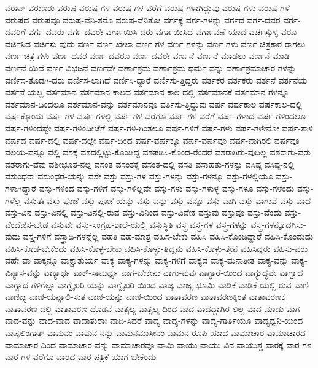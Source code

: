 {ವರಾನ್
ವರುಣರು
ವರುಷ
ವರುಷ-ಗಳ
ವರುಷ-ಗಳ-ವರೆಗೆ
ವರುಷ-ಗಳಾಗಿದ್ದುವು
ವರುಷ-ಗಳು
ವರುಷ-ಗಳೆ
ವರುಷದ
ವರುಷವೂ
ವರುಷ-ವೆನಿ-ತನೊ
ವರುಷ-ವೆನಿತೋ
ವರ್ಗಕ್ಕೆ
ವರ್ಗ-ಗಳನ್ನು
ವರ್ಗದ
ವರ್ಗ-ದವರ
ವರ್ಗ-ದವರಿಗೆ
ವರ್ಗ-ದವರು
ವರ್ಗ-ದವರೇ
ವರ್ಗಾಯಿಸಿ-ದರು
ವರ್ಗಾಯಿಸಿದೆ
ವರ್ಗಾವಣೆ-ಯಾದ
ವರ್ಚಸ್ಸುಳ್ಳ-ವರೂ
ವರ್ಜಿಸಿದ
ವರ್ಜಿಸು-ವುದು
ವರ್ಣ
ವರ್ಣ-ಖೇಲಾ
ವರ್ಣ-ಗಳ
ವರ್ಣ-ಗಳನ್ನು
ವರ್ಣ-ಗಳು
ವರ್ಣ-ಚಿತ್ರಕಾರ-ರಾಗಲು
ವರ್ಣ-ಚಿತ್ರ-ಗಳು
ವರ್ಣ-ದವರ
ವರ್ಣ-ದವರೂ
ವರ್ಣ-ದವರೇ
ವರ್ಣನೆ
ವರ್ಣನೆ-ಮಾಡಲು
ವರ್ಣನೆ-ಮಾಡಿ
ವರ್ಣನೆ-ಯಿದೆ
ವರ್ಣ-ವಿಭಜನೆ
ವರ್ಣವೇ
ವರ್ಣಾಶ್ರಮ
ವರ್ಣಾಶ್ರಮ-ಧರ್ಮ-ವನ್ನು
ವರ್ಣಾಶ್ರಮಾಚಾರ-ಗಳನ್ನು
ವರ್ಣಿಸ-ತೊಡಗಿ-ದರು
ವರ್ಣಿಸ-ಲಾಗಿದೆ
ವರ್ಣಿಸಿ-ದ್ದಾರೆ
ವರ್ಣಿಸು-ತ್ತಿದ್ದರು
ವರ್ತಕರ
ವರ್ತಕರು
ವರ್ತನೆ
ವರ್ತನೆಯ
ವರ್ತನೆ-ಯಲ್ಲ
ವರ್ತಮಾನ
ವರ್ತಮಾನ-ಕಾಲದ
ವರ್ತಮಾನ-ಕಾಲ-ದಲ್ಲಿ
ವರ್ತಮಾನಕೆ
ವರ್ತಮಾನ-ಗಳನ್ನೂ
ವರ್ತಮಾನ-ದಿಂದಲೂ
ವರ್ತಮಾನ-ವನ್ನು
ವರ್ತಮಾನವೂ
ವರ್ತಿಸು-ತ್ತಿದ್ದುವು
ವರ್ಷ
ವರ್ಷಕಾಲ
ವರ್ಷಕಾಲ-ದಲ್ಲಿ
ವರ್ಷಕ್ಕೊಂದು
ವರ್ಷ-ಗಳ
ವರ್ಷ-ಗಳಲ್ಲಿ
ವರ್ಷ-ಗಳ-ವರೆಗೂ
ವರ್ಷ-ಗಳ-ವರೆಗೆ
ವರ್ಷ-ಗಳಾದ
ವರ್ಷ-ಗಳಿಂದಲೂ
ವರ್ಷ-ಗಳಿಂದಷ್ಟೇ
ವರ್ಷ-ಗಳಿಂದೀಚೆಗೆ
ವರ್ಷ-ಗಳಿ-ಗಿಂತಲೂ
ವರ್ಷ-ಗಳಿಗೆ
ವರ್ಷ-ಗಳು
ವರ್ಷ-ಗಳೇನೋ
ವರ್ಷ-ತಾಳಿ
ವರ್ಷದ
ವರ್ಷ-ದಲ್ಲಿ
ವರ್ಷ-ದಲ್ಲೇ
ವರ್ಷ-ದಿಂದ
ವರ್ಷ-ವರ್ಷಕ್ಕೂ
ವರ್ಷ-ವರ್ಷವೂ
ವರ್ಷ-ವಾಗಿರಲಿ
ವರ್ಷವೂ
ವಲಯ-ವನ್ನೂ
ವಲ್ಲಿ
ವಶಕ್ಕೆ
ವಶದಲ್ಲಿಟ್ಟು-ಕೊಂಡಿದ್ದ
ವಶಪಡಿಸಿ-ಕೊಂಡ-ರೆಂದರೆ
ವಶರಾಗಿರು-ವುದಿಲ್ಲ
ವಶರಾಗು-ವರು
ವಶರಾಗು-ವೆವು
ವಶೀಭೂತ-ನಲ್ಲ
ವಸಂತ
ವಸಂತಕ್ಕೆ
ವಸಂತ-ದಲ್ಲಿ
ವಸತಿ
ವಸಾಹತು-ಗಳನ್ನು
ವಸಿಷ್ಠ
ವಸಿಷ್ಠ-ನಲ್ಲಿ
ವಸುಂಧರಾ
ವಸುಂಧರೆ-ಯನ್ನು
ವಸೇ
ವಸ್ತು
ವಸ್ತು-ಗಳ
ವಸ್ತು-ಗಳನ್ನು
ವಸ್ತು-ಗಳನ್ನೂ
ವಸ್ತು-ಗಳಲ್ಲಿಯೂ
ವಸ್ತು-ಗಳಾಗಿದ್ದಾರೆ
ವಸ್ತು-ಗಳಿಂದ
ವಸ್ತು-ಗಳಿಗೆ
ವಸ್ತು-ಗಳಿಲ್ಲವೇ
ವಸ್ತು-ಗಳು
ವಸ್ತು-ಗಳುಳ್ಳ
ವಸ್ತು-ಗಳೂ
ವಸ್ತು-ಗಳೆಂದು
ವಸ್ತು-ಗಳೆಲ್ಲ
ವಸ್ತುತಃ
ವಸ್ತು-ಪೂಜೆ
ವಸ್ತು-ಪೂಜೆ-ಯನ್ನು
ವಸ್ತು-ವನ್ನು
ವಸ್ತು-ವನ್ನೂ
ವಸ್ತು-ವಾಗಿ
ವಸ್ತು-ವಾಗುವೆ
ವಸ್ತು-ವಾದ
ವಸ್ತು-ವಿನ
ವಸ್ತು-ವಿನಲ್ಲಿ
ವಸ್ತು-ವಿನಲ್ಲಿ-ರುವ
ವಸ್ತು-ವಿನಿಂದ
ವಸ್ತು-ವಿವೇಕ
ವಸ್ತುವು
ವಸ್ತುವೂ
ವಸ್ತು-ವೆಂದು
ವಸ್ತು-ವೆಂದೆಣಿಸ-ಬೇಡ
ವಸ್ತುವೇ
ವಸ್ತು-ಸಂಗ್ರಹ-ಶಾಲೆ-ಯಲ್ಲಿ
ವಸ್ತುಸ್ಥಿತಿ
ವಸ್ತ್ರ
ವಸ್ತ್ರ-ಗಳ
ವಸ್ತ್ರ-ಗಳನ್ನು
ವಸ್ತ್ರ-ಗಳನ್ನೊದಗಿಸು-ವುದು
ವಸ್ತ್ರ-ಗಳಿಗೆ
ವಸ್ತ್ರಾದಿ-ಗಳನ್ನೆಲ್ಲ
ವಹತಿ
ವಹ-ಮಾತ್ರ
ವಹಿಸ-ಬೇಕು
ವಹಿಸಿ
ವಹಿಸಿ-ಕೊಂಡಿದ್ದಾರೆ
ವಹಿಸಿ-ಕೊಂಡುದು
ವಹಿಸಿ-ಕೊಡ-ಬೇಕೆಂದು
ವಹಿಸಿ-ಕೊಳ್ಳ-ಬೇಕು
ವಹಿಸಿ-ಕೊಳ್ಳು-ತ್ತಿದ್ದನು
ವಹಿಸಿ-ಕೊಳ್ಳು-ತ್ತೇನೆ
ವಹಿಸಿದ್ದರು
ವಹಿಸು-ವರು
ವಹೇ
ವಾ
ವಾಕ್ಕನ್ನೂ
ವಾಕ್ಚಾತುರ್ಯ
ವಾಕ್ಯ
ವಾಕ್ಯ-ಗಳನ್ನು
ವಾಕ್ಯ-ಗಳಿಗೆ
ವಾಕ್ಯದ
ವಾಕ್ಯ-ಮನಾತೀತ
ವಾಕ್ಯ-ವನ್ನು
ವಾಕ್ಯ-ವಿನ್ಯಾಸ-ವನ್ನು
ವಾಕ್ಯಾರ್ಥ
ವಾಕ್-ಸಾಮರ್ಥ್ಯ
ವಾಗ-ಬೇಕೇನು
ವಾಗು-ವುವು
ವಾಗ್ಧಾರೆ-ಯಿಂದ
ವಾಗ್ಯುದ್ಧವೇ
ವಾಗ್ವಾದ
ವಾಗ್ವಾದ-ಗಳಿಗೆಲ್ಲಾ
ವಾಗ್ವೈಖರಿ-ಯನ್ನು
ವಾಗ್ವೈಖರಿ-ಯಿಂದ
ವಾಜ್ಯ
ವಾಜ್ಯ-ಭೂಮಿ
ವಾಡಿಕೆ
ವಾಡಿಕೆ-ಯಲ್ಲಿ-ರುವ
ವಾಣಿ
ವಾಣಿಜ್ಯ
ವಾಣಿ-ಯನ್ನಾಲಿ-ಸುತ
ವಾಣಿ-ಯನ್ನು
ವಾಣಿ-ಯಿಂದ
ವಾತಾವರಣ
ವಾತಾವರಣಕ್ಕಿಂತ
ವಾತಾವರಣಕ್ಕೆ
ವಾತಾವರಣ-ದಲ್ಲಿ
ವಾತಾವರಣ-ದೊಡನೆ
ವಾತ್ಸಲ್ಯ
ವಾತ್ಸಲ್ಯ-ದಿಂದ
ವಾದ
ವಾದದ್ದಾಗಿರ-ಲಿಲ್ಲ
ವಾದ-ಮಾಡು-ವಾಗ
ವಾದ-ವನ್ನು
ವಾದ-ವಾದ
ವಾದಾತುರಾಃ
ವಾದಿ-ಸಿದರೆ
ವಾದ್ಯ
ವಾದ್ಯ-ಗಳನ್ನು
ವಾದ್ಯ-ಗಾರ್ತಿಯೂ
ವಾದ್ಯಧ್ವನಿ-ಯಿಂದ
ವಾಪ್ಯಲಿಂಗಾತ್
ವಾಮನಂ
ವಾಮನ-ನನ್ನು
ವಾಮನಮಾಸೀನಂ
ವಾಮನ-ರೂಪಿ-ಯಾದ
ವಾಮಾಚಾರ
ವಾಮಾಚಾರದ
ವಾಮಾಚಾರ-ದಿಂದ
ವಾಮಾಚಾರ-ವನ್ನು
ವಾಮಾಚಾರವೂ
ವಾಮಿ
ವಾಯು
ವಾಯು-ವಿನ
ವಾಯುಶ್ಚ
ವಾರಕ್ಕೆ
ವಾರ-ಗಳ
ವಾರ-ಗಳ-ವರೆಗೂ
ವಾರದ
ವಾರ-ಪತ್ರಿಕೆ-ಯಾಗ-ಬೇಕೆಂದು
}

